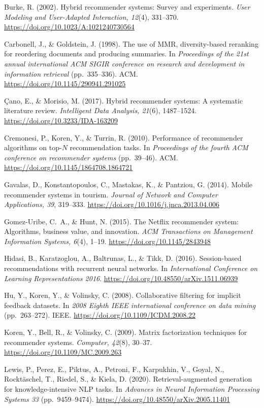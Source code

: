 \documentclass[12pt,letterpaper]{article}
\begin{document}
Burke, R. (2002). Hybrid recommender systems: Survey and experiments. \textit{User Modeling and User-Adapted Interaction, 12}(4), 331--370. \url{https://doi.org/10.1023/A:1021240730564}

Carbonell, J., \& Goldstein, J. (1998). The use of MMR, diversity-based reranking for reordering documents and producing summaries. In \textit{Proceedings of the 21st annual international ACM SIGIR conference on research and development in information retrieval} (pp.~335--336). ACM. \url{https://doi.org/10.1145/290941.291025}

\c{C}ano, E., \& Morisio, M. (2017). Hybrid recommender systems: A systematic literature review. \textit{Intelligent Data Analysis, 21}(6), 1487--1524. \url{https://doi.org/10.3233/IDA-163209}

Cremonesi, P., Koren, Y., \& Turrin, R. (2010). Performance of recommender algorithms on top-$N$ recommendation tasks. In \textit{Proceedings of the fourth ACM conference on recommender systems} (pp.~39--46). ACM. \url{https://doi.org/10.1145/1864708.1864721}

Gavalas, D., Konstantopoulos, C., Mastakas, K., \& Pantziou, G. (2014). Mobile recommender systems in tourism. \textit{Journal of Network and Computer Applications, 39}, 319--333. \url{https://doi.org/10.1016/j.jnca.2013.04.006}

Gomez-Uribe, C.~A., \& Hunt, N. (2015). The Netflix recommender system: Algorithms, business value, and innovation. \textit{ACM Transactions on Management Information Systems, 6}(4), 1--19. \url{https://doi.org/10.1145/2843948}

Hidasi, B., Karatzoglou, A., Baltrunas, L., \& Tikk, D. (2016). Session-based recommendations with recurrent neural networks. In \textit{International Conference on Learning Representations 2016}. \url{https://doi.org/10.48550/arXiv.1511.06939}

Hu, Y., Koren, Y., \& Volinsky, C. (2008). Collaborative filtering for implicit feedback datasets. In \textit{2008 Eighth IEEE international conference on data mining} (pp.~263--272). IEEE. \url{https://doi.org/10.1109/ICDM.2008.22}

Koren, Y., Bell, R., \& Volinsky, C. (2009). Matrix factorization techniques for recommender systems. \textit{Computer, 42}(8), 30--37. \url{https://doi.org/10.1109/MC.2009.263}

Lewis, P., Perez, E., Piktus, A., Petroni, F., Karpukhin, V., Goyal, N., Rockt\"{a}schel, T., Riedel, S., \& Kiela, D. (2020). Retrieval-augmented generation for knowledge-intensive NLP tasks. In \textit{Advances in Neural Information Processing Systems 33} (pp.~9459--9474). \url{https://doi.org/10.48550/arXiv.2005.11401}
\end{document}
